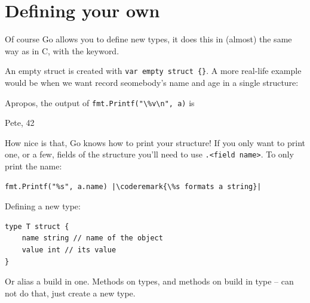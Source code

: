 \section{Defining your own}
\label{sec:defining your own}
Of course Go allows you to define new types, it does this in (almost) the
same way as in C, with the  keyword.

An empty struct is created with \lstinline|var empty struct {}|.
A more real-life example would be when we want record seomebody's name
and age in a single structure:



Apropos, the output of \lstinline{fmt.Printf("\%v\n", a)} is 
\begin{display}
{Pete, 42}
\end{display}
How nice is that, Go knows how to print your structure! If you
only want to print one, or a few, fields of the structure you'll
need to use \verb|.<field name>|. To only print the name:
\begin{lstlisting}
fmt.Printf("%s", a.name) |\coderemark{\%s formats a string}|
\end{lstlisting}

Defining a new type:

\begin{lstlisting}
type T struct {
    name string // name of the object
    value int // its value
}
\end{lstlisting}

Or alias a build in one.
Methods on types, and methods on build in type -- can not do that,
just create a new type.

